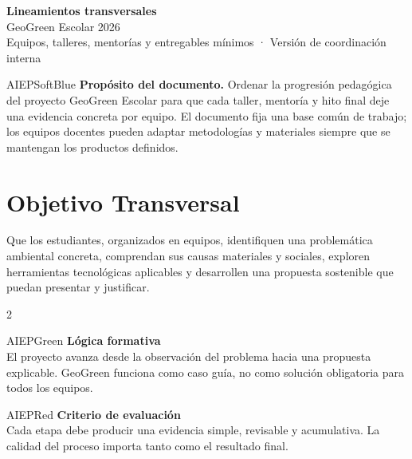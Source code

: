 \documentclass[10pt,letterpaper]{article}
\begin{document}
\begin{tcolorbox}[
  enhanced,
  colback=AIEPNavy,
  colframe=AIEPNavy,
  arc=0mm,
  boxrule=0pt,
  left=5mm,
  right=5mm,
  top=5mm,
  bottom=5mm
]
{\color{white}\Huge\bfseries Lineamientos transversales}\\[2mm]
{\color{white}\Large GeoGreen Escolar 2026}\\[3mm]
{\color{AIEPSoftBlue} Equipos, talleres, mentorías y entregables mínimos · Versión de coordinación interna}
\end{tcolorbox}

\vspace{1mm}

\begin{infobox}{AIEPSoftBlue}
\textbf{\textcolor{AIEPNavy}{Propósito del documento.}}
Ordenar la progresión pedagógica del proyecto GeoGreen Escolar para que cada taller, mentoría y hito final deje una evidencia concreta por equipo. El documento fija una base común de trabajo; los equipos docentes pueden adaptar metodologías y materiales siempre que se mantengan los productos definidos.
\end{infobox}

\section{Objetivo Transversal}

Que los estudiantes, organizados en equipos, identifiquen una problemática ambiental concreta, comprendan sus causas materiales y sociales, exploren herramientas tecnológicas aplicables y desarrollen una propuesta sostenible que puedan presentar y justificar.

\begin{multicols}{2}
\begin{infobox}{AIEPGreen}
\textbf{Lógica formativa}\\
El proyecto avanza desde la observación del problema hacia una propuesta explicable. GeoGreen funciona como caso guía, no como solución obligatoria para todos los equipos.
\end{infobox}

\begin{infobox}{AIEPRed}
\textbf{Criterio de evaluación}\\
Cada etapa debe producir una evidencia simple, revisable y acumulativa. La calidad del proceso importa tanto como el resultado final.
\end{infobox}
\end{multicols}
\end{document}
